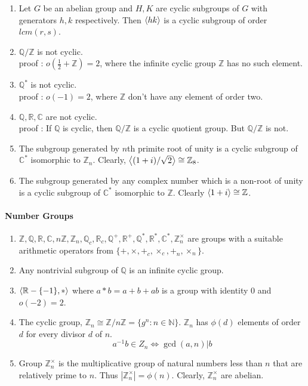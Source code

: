 \begin{enumerate}
	\item Let $G$ be an abelian group and $H,K$ are cyclic subgroups of $G$ with generators $h,k$ respectively. Then $\left\langle hk \right\rangle$ is a cyclic subgroup of order $lcm(r,s)$.
	\item $\mathbb{Q}/\mathbb{Z}$ is not cyclic.\\
		proof : $o(\frac{1}{2} + \mathbb{Z}) = 2$, where the infinite cyclic group $\mathbb{Z}$ has no such element.
	\item $\mathbb{Q}^\ast$ is not cyclic.\\
		proof : $o(-1) = 2$, where $\mathbb{Z}$ don't have any element of order two.
	\item $\mathbb{Q},\mathbb{R},\mathbb{C}$ are not cyclic.\\
		proof : If $\mathbb{Q}$ is cyclic, then $\mathbb{Q}/\mathbb{Z}$ is a cyclic quotient group. But $\mathbb{Q}/\mathbb{Z}$ is not.
	\item The subgroup generated by $n$th primite root of unity is a cyclic subgroup of $\mathbb{C}^\ast$ isomorphic to $\mathbb{Z}_n$.
		Clearly, $\left\langle (1+i)/\sqrt{2} \right\rangle \cong \mathbb{Z}_8$.
	\item The subgroup generated by any complex number which is a non-root of unity is a cyclic subgroup of $\mathbb{C}^\ast$ isomorphic to $\mathbb{Z}$.
		Clearly $\left\langle 1+i \right\rangle \cong \mathbb{Z}$.
\end{enumerate}

\paragraph{Number Groups}
\begin{enumerate}
	\item $\mathbb{Z},\mathbb{Q},\mathbb{R},\mathbb{C}, n\mathbb{Z}, \mathbb{Z}_n, \mathbb{Q}_c, \mathbb{R}_c, \mathbb{Q}^+, \mathbb{R}^+, \mathbb{Q}^\ast, \mathbb{R}^\ast, \mathbb{C}^\ast, \mathbb{Z}_n^\times$ are groups with a suitable arithmetic operators from $\{ +,\times,+_c,\times_c,+_n,\times_n\}$.
	\item Any nontrivial subgroup of $\mathbb{Q}$ is an infinite cyclic group.
	\item $\left\langle \mathbb{R}-\{-1\},\ast \right\rangle$ where $a \ast b = a+b+ab$ is a group with identity $0$ and $o(-2)=2$.
	\item The cyclic group, $\mathbb{Z}_n \cong \mathbb{Z}/n\mathbb{Z} = \{ g^n : n \in \mathbb{N}\}$. $\mathbb{Z}_n$ has $\phi(d)$ elements of order $d$ for every divisor $d$ of $n$.
	$$a^{-1}b \in Z_n \iff \gcd(a,n)|b$$
	\item Group $\mathbb{Z}_n^\times$ is the multiplicative group of natural numbers less than $n$ that are relatively prime to $n$. Thus $|\mathbb{Z}_n^\times| = \phi(n)$.
	Clearly, $\mathbb{Z}_n^\times$ are abelian.
\end{enumerate}

